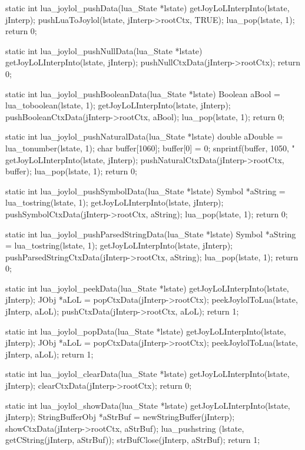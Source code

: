 \startCCode
static int lua_joylol_pushData(lua_State *lstate) {
  getJoyLoLInterpInto(lstate, jInterp);
  pushLuaToJoylol(lstate, jInterp->rootCtx, TRUE);
  lua_pop(lstate, 1);
  return 0;
}

static int lua_joylol_pushNullData(lua_State *lstate) {
  getJoyLoLInterpInto(lstate, jInterp);
  pushNullCtxData(jInterp->rootCtx);
  return 0;
}

static int lua_joylol_pushBooleanData(lua_State *lstate) {
  Boolean aBool = lua_toboolean(lstate, 1);
  getJoyLoLInterpInto(lstate, jInterp);
  pushBooleanCtxData(jInterp->rootCtx, aBool);
  lua_pop(lstate, 1);
  return 0;
}

static int lua_joylol_pushNaturalData(lua_State *lstate) {
  double aDouble = lua_tonumber(lstate, 1);
  char buffer[1060];
  buffer[0] = 0;
  snprintf(buffer, 1050, "%
  getJoyLoLInterpInto(lstate, jInterp);
  pushNaturalCtxData(jInterp->rootCtx, buffer);
  lua_pop(lstate, 1);
  return 0;
}

static int lua_joylol_pushSymbolData(lua_State *lstate) {
  Symbol *aString = lua_tostring(lstate, 1);
  getJoyLoLInterpInto(lstate, jInterp);
  pushSymbolCtxData(jInterp->rootCtx, aString);
  lua_pop(lstate, 1);
  return 0;
}

static int lua_joylol_pushParsedStringData(lua_State *lstate) {
  Symbol *aString = lua_tostring(lstate, 1);
  getJoyLoLInterpInto(lstate, jInterp);
  pushParsedStringCtxData(jInterp->rootCtx, aString);
  lua_pop(lstate, 1);
  return 0;
}

static int lua_joylol_peekData(lua_State *lstate) {
  getJoyLoLInterpInto(lstate, jInterp);
  JObj *aLoL = popCtxData(jInterp->rootCtx);
  peekJoylolToLua(lstate, jInterp, aLoL);
  pushCtxData(jInterp->rootCtx, aLoL);
  return 1;
}

static int lua_joylol_popData(lua_State *lstate) {
  getJoyLoLInterpInto(lstate, jInterp);
  JObj *aLoL = popCtxData(jInterp->rootCtx);
  peekJoylolToLua(lstate, jInterp, aLoL);
  return 1;
}

static int lua_joylol_clearData(lua_State *lstate) {
  getJoyLoLInterpInto(lstate, jInterp);
  clearCtxData(jInterp->rootCtx);
  return 0;
}

static int lua_joylol_showData(lua_State *lstate) {
  getJoyLoLInterpInto(lstate, jInterp);
  StringBufferObj *aStrBuf = newStringBuffer(jInterp);
  showCtxData(jInterp->rootCtx, aStrBuf);
  lua_pushstring (lstate, getCString(jInterp, aStrBuf));
  strBufClose(jInterp, aStrBuf);
  return 1;
}
\stopCCode

